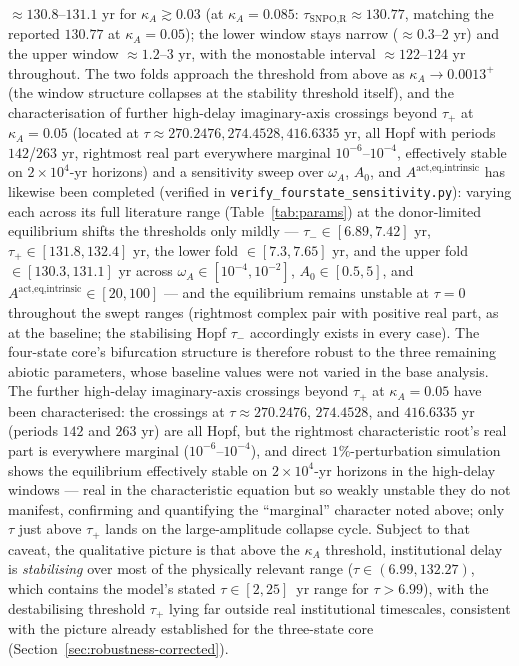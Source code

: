 \documentclass[twocolumn,10pt]{article}
\begin{document}
$\approx130.8$--$131.1$ yr for $\kappa_A\gtrsim0.03$ (at $\kappa_A=0.085$: $\tau_{\text{SNPO,R}}\approx130.77$, matching the reported $130.77$ at $\kappa_A=0.05$); the lower window stays narrow ($\approx0.3$--$2$ yr) and the upper window $\approx1.2$--$3$ yr, with the monostable interval $\approx122$--$124$ yr throughout. The two folds approach the threshold from above as $\kappa_A\to0.0013^+$ (the window structure collapses at the stability threshold itself), and the characterisation of further high-delay imaginary-axis crossings beyond $\tau_+$ at $\kappa_A=0.05$ (located at $\tau\approx270.2476,274.4528,416.6335$ yr, all Hopf with periods $142$/$263$ yr, rightmost real part everywhere marginal $10^{-6}$--$10^{-4}$, effectively stable on $2\times10^4$-yr horizons) and a sensitivity sweep over $\omega_A$, $A_0$, and $A^{\text{act,eq,intrinsic}}$ has likewise been completed (verified in \texttt{verify\_fourstate\_sensitivity.py}): varying each across its full literature range (Table~\ref{tab:params}) at the donor-limited equilibrium shifts the thresholds only mildly --- $\tau_-\in[6.89,7.42]$ yr, $\tau_+\in[131.8,132.4]$ yr, the lower fold $\in[7.3,7.65]$ yr, and the upper fold $\in[130.3,131.1]$ yr across $\omega_A\in[10^{-4},10^{-2}]$, $A_0\in[0.5,5]$, and $A^{\text{act,eq,intrinsic}}\in[20,100]$ --- and the equilibrium remains unstable at $\tau=0$ throughout the swept ranges (rightmost complex pair with positive real part, as at the baseline; the stabilising Hopf $\tau_-$ accordingly exists in every case). The four-state core's bifurcation structure is therefore robust to the three remaining abiotic parameters, whose baseline values were not varied in the base analysis. The further high-delay imaginary-axis crossings beyond $\tau_+$ at $\kappa_A=0.05$ have been characterised: the crossings at $\tau\approx270.2476$, $274.4528$, and $416.6335$ yr (periods $142$ and $263$ yr) are all Hopf, but the rightmost characteristic root's real part is everywhere marginal ($10^{-6}$--$10^{-4}$), and direct $1\%$-perturbation simulation shows the equilibrium effectively stable on $2\times10^4$-yr horizons in the high-delay windows --- real in the characteristic equation but so weakly unstable they do not manifest, confirming and quantifying the ``marginal'' character noted above; only $\tau$ just above $\tau_+$ lands on the large-amplitude collapse cycle. Subject to that caveat, the qualitative picture is that above the $\kappa_A$ threshold, institutional delay is \emph{stabilising} over most of the physically relevant range ($\tau\in(6.99,132.27)$, which contains the model's stated $\tau\in[2,25]$~yr range for $\tau>6.99$), with the destabilising threshold $\tau_+$ lying far outside real institutional timescales, consistent with the picture already established for the three-state core (Section~\ref{sec:robustness-corrected}).
\end{document}

